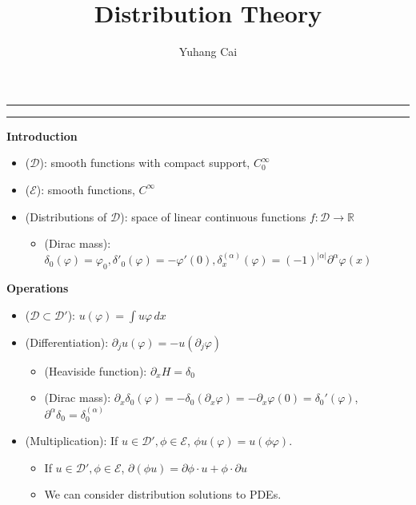 \documentclass[a4paper, 11pt]{article}
\makeatletter
\renewcommand\maketitle
  {\vspace{-2em}
  \hrule
  \vspace{1em}
  \noindent
   {\hfill \Huge\bfseries\@title \hfill}%
   \medskip\par\noindent
   {\large\bfseries\@author}%
   \hfill
   {\large\@date}%
   \bigskip\par\noindent
   \hrule
   \vspace{1em}
  }
\theoremstyle{definition}
\theoremstyle{remark}
\newcommand{\cD}{\mathcal{D}}
\newcommand{\cE}{\mathcal{E}}
\newcommand{\RR}{\mathbb{R}}
\makeatother
\begin{document}
	\title{Distribution Theory}%
	\author{Yuhang Cai} %
	\maketitle

\textbf{Introduction}
\begin{itemize}
    \item ($\cD$): smooth functions with compact support, $C_0^\infty$
    \item ($\cE$): smooth functions, $C^\infty$
    \item (Distributions of $\cD$): space of linear continuous functions $f: \cD \to \RR$
    \begin{itemize}
        \item (Dirac mass): $\delta_0 (\varphi) = \varphi_0, \delta'_0(\varphi) = -\varphi'(0), \delta_x^{(\alpha)}(\varphi) = (-1)^{|\alpha|}\partial^{\alpha}\varphi(x)$
    \end{itemize}
\end{itemize}

\textbf{Operations}
\begin{itemize}
    \item ($\cD \subset \cD'$): $u(\varphi) = \int u\varphi\, dx$
    \item (Differentiation): $\partial_j u(\varphi) = -u(\partial_j \varphi)$
    \begin{itemize}
        \item (Heaviside function): $\partial_x H = \delta_0$
        \item (Dirac mass): $ \partial_x \delta_0(\varphi) = -\delta_0(\partial_x \varphi) = -\partial_x \varphi(0) = \delta_0'(\varphi)$, $\partial^\alpha \delta_0 = \delta_0^{(\alpha)}$
    \end{itemize} 
    \item (Multiplication): If $u\in \cD', \phi \in \cE$, $\phi u(\varphi) = u(\phi\varphi)$.
    \begin{itemize}
        \item If $u\in \cD', \phi \in \cE$, $\partial(\phi u) = \partial \phi \cdot u + \phi \cdot \partial u$
        \item We can consider distribution solutions to PDEs.
    \end{itemize}
\end{itemize}
\end{document}

